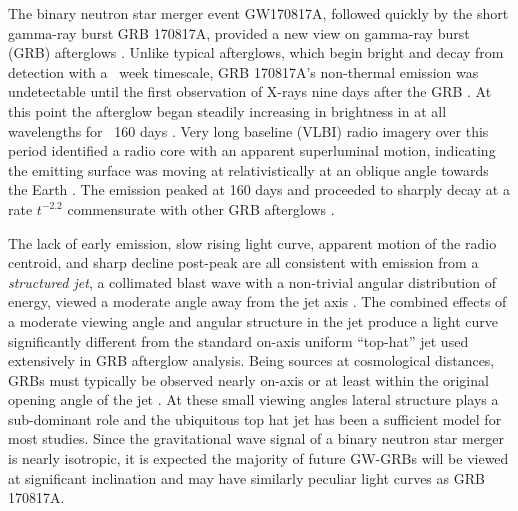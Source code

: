 \documentclass[twocolumn]{aastex62}
\newcommand{\gwbns}{GW170817A}
\newcommand{\grbbns}{GRB 170817A}
\begin{document}
The binary neutron star merger event \gwbns{}, followed quickly by the short gamma-ray burst \grbbns{}, provided a new view on gamma-ray burst (GRB) afterglows \citep{Abbott:2017ab, Abbott:2017ac}.  Unlike typical afterglows, which begin bright and decay from detection with a ~week timescale, \grbbns{}'s non-thermal emission was undetectable until the first observation of X-rays nine days after the GRB \citep{Troja:2017aa}.  At this point the afterglow began steadily increasing in brightness in at all wavelengths for ~160 days \citep{Haggard:2017aa, Hallinan:2017aa, DAvanzo:2018aa,  Lyman:2018aa, Margutti:2018aa, Mooley:2018aa, Troja:2018aa, Troja:2019ab}.  Very long baseline (VLBI) radio imagery over this period identified a radio core with an apparent superluminal motion, indicating the emitting surface was moving at relativistically at an oblique angle towards the Earth \citep{Mooley:2018ab}. The emission peaked at 160 days and proceeded to sharply decay at a rate $t^{-2.2}$ commensurate with other GRB afterglows \citep{Alexander:2018aa, Fong:2019aa, Lamb:2019aa, Troja:2019ab}.

The lack of early emission, slow rising light curve, apparent motion of the radio centroid, and sharp decline post-peak are all consistent with emission from a \emph{structured jet}, a collimated blast wave with a non-trivial angular distribution of energy, viewed a moderate angle away from the jet axis \citep{Lamb:2017aa, Alexander:2018aa, Hotokezaka:2018aa, Wu:2018aa, Xie:2018aa,  Ghirlanda:2019aa, Fong:2019aa, Lamb:2019aa, Troja:2019aa}.  The combined effects of a moderate viewing angle and angular structure in the jet produce a light curve significantly different from the standard on-axis uniform ``top-hat'' jet used extensively in GRB afterglow analysis. Being sources at cosmological distances, GRBs must typically be observed nearly on-axis or at least within the original opening angle of the jet \citep{Ryan:2015aa}. At these small viewing angles lateral structure plays a sub-dominant role and the ubiquitous top hat jet has been a sufficient model for most studies.  Since the gravitational wave signal of a binary neutron star merger is nearly isotropic, it is expected the majority of future GW-GRBs will be viewed at significant inclination and may have similarly peculiar light curves as \grbbns{}.
\end{document}
